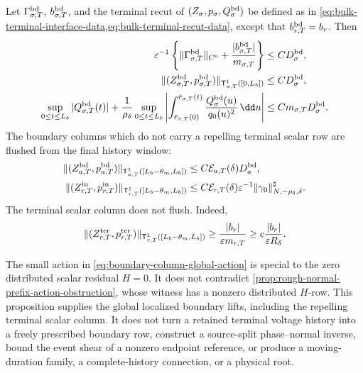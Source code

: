 \begin{proposition}
Let \(\Gamma_{\sigma,T}^{\rm bd}\),
\(b_{\sigma,T}^{\rm bd}\), and the terminal recut of
\((Z_\sigma,p_\sigma,Q_\sigma^{\rm bd})\) be defined as in
\cref{eq:bulk-terminal-interface-data,eq:bulk-terminal-recut-data}, except
that \(b_{r,T}^{\rm bd}=b_r\).  Then
\begin{align}
 \varepsilon^{-1}\left\{
   \|\Gamma_{\sigma,T}^{\rm bd}\|_{C^0}
      +\frac{|b_{\sigma,T}^{\rm bd}|}{m_{\sigma,T}}
                    \right\}
 &\le C D_{\sigma}^{\rm bd},\notag\\
 \|(Z_{\sigma,T}^{\rm bd},p_{\sigma,T}^{\rm bd})\|_
       {\mathsf T_{\sigma,T}^1([0,L_b])}
 &\le C D_{\sigma}^{\rm bd},\notag\\
 \sup_{0\le t\le L_b}|Q_{\sigma,T}^{\rm bd}(t)|
 +\frac1{\rho_\delta}\sup_{0\le t\le L_b}
  \left|\int_{\bar r_{\sigma,T}(0)}^{\bar r_{\sigma,T}(t)}
       \frac{Q_{\sigma}^{\rm bd}(u)}{q_0(u)^2}\,\dd u\right|
 &\le C m_{\sigma,T}D_{\sigma}^{\rm bd}.        \label{eq:boundary-column-terminal-trace}
\end{align}
The boundary columns which do not carry a repelling terminal scalar row
are flushed from the final history window:
\begin{align}
 \|(Z_{a,T}^{\rm bd},p_{a,T}^{\rm bd})\|_
       {\mathsf T_{a,T}^1([L_b-\theta_m,L_b])}
 &\le C\mathcal E_{a,T}(\delta)D_a^{\rm bd},\notag\\
 \|(Z_{r,T}^{\rm in},p_{r,T}^{\rm in})\|_
       {\mathsf T_{r,T}^1([L_b-\theta_m,L_b])}
 &\le C\mathcal E_{r,T}(\delta)
       \varepsilon^{-1}
       \|\gamma_0\|_{N,-\rho_\delta,\delta}^{\sharp}.       \label{eq:boundary-column-final-flush}
\end{align}
The terminal scalar column does not flush.  Indeed,
\begin{equation}
 \|(Z_{r,T}^{\rm ter},p_{r,T}^{\rm ter})\|_
       {\mathsf T_{r,T}^1([L_b-\theta_m,L_b])}
 \ge \frac{|b_r|}{\varepsilon m_{r,T}}
 \ge c\frac{|b_r|}{\varepsilon R_\delta}.       \label{eq:boundary-terminal-column-nonflush}
\end{equation}

The small action in \cref{eq:boundary-column-global-action} is special to
the zero distributed scalar residual \(H=0\).  It does not contradict
\cref{prop:rough-normal-prefix-action-obstruction}, whose witness has a
nonzero distributed \(H\)-row.  This proposition supplies the global
localized boundary lifts, including the repelling terminal scalar column.
It does not turn a retained terminal voltage history into a freely
prescribed boundary row, construct a source-split phase--normal inverse,
bound the event shear of a nonzero endpoint reference, or produce a
moving-duration family, a complete-history connection, or a physical root.
\end{proposition}

